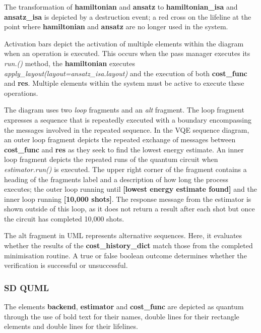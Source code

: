 \documentclass{article}
\begin{document}
The transformation of \textbf{hamiltonian} and \textbf{ansatz} to \textbf{hamiltonian\_isa} and \textbf{ansatz\_isa} is depicted by a destruction event; a red cross on the lifeline at the point where \textbf{hamiltonian} and \textbf{ansatz} are no longer used in the system.

Activation bars depict the activation of multiple elements within the diagram when an operation is executed\cite{creatley}. This occurs when the pass manager executes its \textit{run.()} method, the  \textbf{hamiltonian} executes \textit{apply\_layout(layout=ansatz\_isa.layout)} and the execution of both \textbf{cost\_func} and \textbf{res}. Multiple elements within the system must be active to execute these operations.

The diagram uses two \textit{loop} fragments and an \textit{alt} fragment. The loop fragment expresses a sequence that is repeatedly executed with a boundary encompassing the messages involved in the repeated sequence\cite{Seidl_Scholz_Huemer_Kappel_Duffy_2014}. In the VQE sequence diagram, an outer loop fragment depicts the repeated exchange of messages between \textbf{cost\_func} and \textbf{res} as they seek to find the lowest energy estimate. An inner loop fragment depicts the repeated runs of the quantum circuit when \textit{estimator.run()} is executed. The upper right corner of the fragment contains a heading of the fragments label and a description of how long the process executes; the outer loop running until \textbf{[lowest energy estimate found]} and the inner loop running \textbf{[10,000 shots]}. The response message from the estimator is shown outside of this loop, as it does not return a result after each shot but once the circuit has completed 10,000 shots. 

The alt fragment in UML represents alternative sequences\cite{Seidl_Scholz_Huemer_Kappel_Duffy_2014}. Here, it evaluates whether the results of the \textbf{cost\_history\_dict} match those from the completed minimisation routine. A true or false boolean outcome determines whether the verification is successful or unsuccessful.

\subsubsection{SD QUML}

The elements \textbf{backend}, \textbf{estimator} and \textbf{cost\_func} are depicted as quantum through the use of bold text for their names, double lines for their rectangle elements and double lines for their lifelines. 
\end{document}
